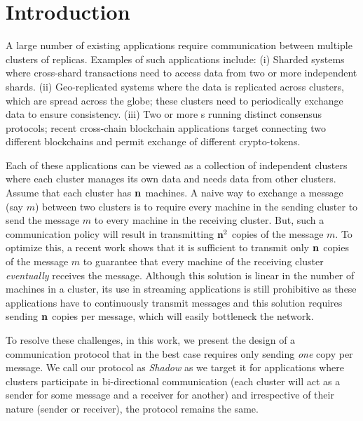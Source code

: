 \section{Introduction}
A large number of existing applications require communication between multiple clusters of replicas. 
Examples of such applications include: 
(i) Sharded systems where cross-shard transactions need to access data from two or more independent shards.
(ii) Geo-replicated systems where the data is replicated across clusters, which are spread across the globe;
these clusters need to periodically exchange data to ensure consistency.
(iii) Two or more s running distinct consensus protocols; recent cross-chain blockchain applications
target connecting two different blockchains and permit exchange of different crypto-tokens.

Each of these applications can be viewed as a collection of independent clusters where each cluster manages its 
own data and needs data from other clusters.
Assume that each cluster has $\textbf{n}_{}$ machines.
A naive way to exchange a message (say $m$) between two clusters is to require every machine in the sending cluster to send the
message $m$ to every machine in the receiving cluster. 
But, such a communication policy will result in transmitting $\textbf{n}_{}^2$ copies of the message $m$.
To optimize this, a recent work shows that it is sufficient to transmit only $\textbf{n}_{}$ copies of the message $m$ 
to guarantee that every machine of the receiving cluster {\em eventually} receives the message.
Although this solution is linear in the number of machines in a cluster, 
its use in streaming applications is still prohibitive as these applications have to continuously transmit 
messages and this solution requires sending $\textbf{n}_{}$ copies per message, which will easily bottleneck the network.

To resolve these challenges, in this work, we present the design of a communication protocol that 
in the best case requires only sending {\em one} copy per message. 
We call our protocol as {\em Shadow} as we target it for applications where clusters participate in 
bi-directional communication (each cluster will act as a sender for some message and a receiver for another) and 
irrespective of their nature (sender or receiver), the protocol remains the same.




